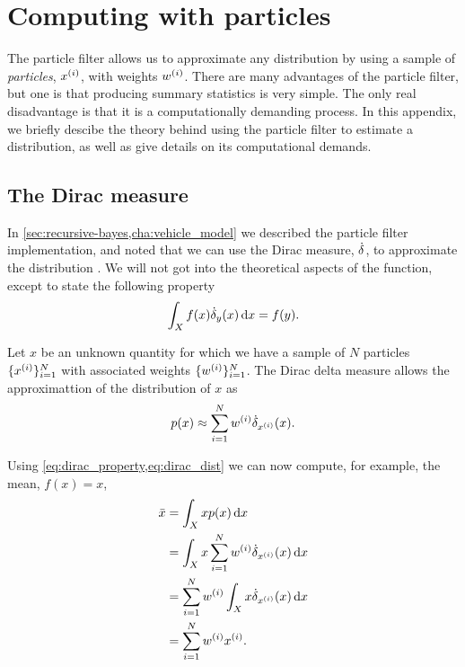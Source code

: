 \chapter{Computing with particles}
\label{app:computing-with-particles}

The particle filter allows us to approximate any distribution by using a sample of \emph{particles}, $x^{(i)}$, with weights $w^{(i)}$. There are many advantages of the particle filter, but one is that producing summary statistics is very simple. The only real disadvantage is that it is a computationally demanding process. In this appendix, we briefly descibe the theory behind using the particle filter to estimate a distribution, as well as give details on its computational demands.


\section{The Dirac measure}
\label{app:dirac-delta-measure}

In \cref{sec:recursive-bayes,cha:vehicle_model} we described the particle filter implementation, and noted that we can use the Dirac measure, $\dot\delta$, to approximate the distribution \citep{Benedetto_1996}. We will not got into the theoretical aspects of the function, except to state the following property
\:
\begin{equation}
\label{eq:dirac_property}
\int_X f(x) \dot\delta_y(x)\,\mathrm{d}x = f(y).
\end{equation}

Let $x$ be an unknown quantity for which we have a sample of $N$ particles $\{x^{(i)}\}_{i=1}^N$ with associated weights $\{w^{(i)}\}_{i=1}^N$. The Dirac delta measure allows the approximattion of the distribution of $x$ as
\begin{equation}
\label{eq:dirac_dist}
p(x) \approx \sum_{i=1}^N w^{(i)} \dot\delta_{x^{(i)}}(x).
\end{equation}


Using \cref{eq:dirac_property,eq:dirac_dist} we can now compute, for example, the mean, $f(x) = x$,
\begin{equation}
\label{eq:dirac_mean}
\begin{split}
\bar x &= \int_X x p(x) \,\mathrm{d}x \\
&= \int_X x \sum_{i=1}^N w^{(i)} \dot\delta_{x^{(i)}}(x) \,\mathrm{d}x \\
&= \sum_{i=1}^N w^{(i)} \int_X x \dot\delta_{x^{(i)}}(x) \,\mathrm{d}x \\
&= \sum_{i=1}^N w^{(i)} x^{(i)}.
\end{split}
\end{equation}




